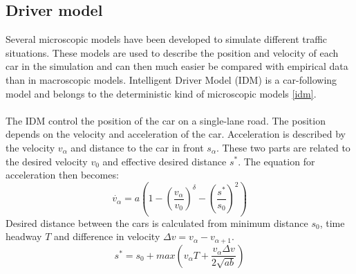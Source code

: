 \subsection{Driver model}
Several microscopic models have been developed to simulate different traffic
situations. These models are used to describe the position and velocity of each car in the simulation and can then much easier be compared with empirical data than in macroscopic models. Intelligent Driver Model (IDM) is a car-following
model and belongs to the deterministic kind of microscopic models \ref{idm}.\\\\

The IDM control the position of the car on a single-lane road. The position depends on the velocity and acceleration of the car. Acceleration is described by the velocity \begin{math}v_\alpha\end{math} and distance to the car in front \begin{math}s_\alpha\end{math}. These two parts are related to the desired velocity \begin{math}v_0\end{math} and effective desired distance \begin{math}s^\ast\end{math}. The equation for acceleration then becomes:
\begin{equation}\label{driver_acc}\dot{v_\alpha} = a(1-(\frac{v_\alpha}{v_0})^\delta-(\frac{s^\ast}{s_0})^2)\end{equation}
Desired distance between the cars is calculated from minimum distance \begin{math}s_0\end{math}, time headway \begin{math}T\end{math} and difference in velocity \begin{math}\Delta v = v_\alpha - v_{\alpha + 1}\end{math}.
\begin{equation}\label{desireddist}s^\ast = s_0 + max(v_\alpha T + \frac{v_\alpha \Delta v}{2\sqrt{ab}})\end{equation}
